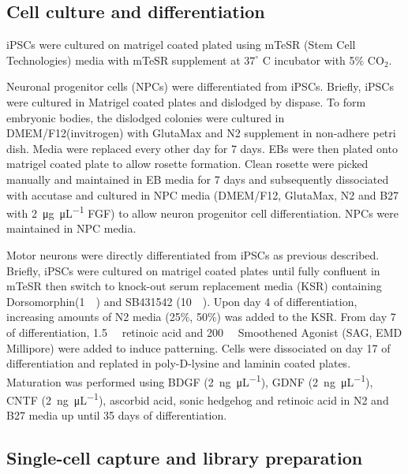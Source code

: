 

\subsection{Cell culture and differentiation}

iPSCs were cultured on matrigel coated plated using mTeSR (Stem Cell Technologies) media with mTeSR supplement at $37^\circ$ C incubator with 5\% CO$_{2}$.\par

Neuronal progenitor cells (NPCs) were differentiated from iPSCs. Briefly, iPSCs were cultured in Matrigel coated plates and dislodged by dispase. To form embryonic bodies, the dislodged colonies were cultured in DMEM/F12(invitrogen) with GlutaMax and N2 supplement in non-adhere petri dish. Media were replaced every other day for 7 days. EBs were then plated onto matrigel coated plate to allow rosette formation. Clean rosette were picked manually and maintained in EB media for 7 days and subsequently dissociated with accutase and cultured in NPC media (DMEM/F12, GlutaMax, N2 and B27 with \SI[per-mode=symbol]{2}{\micro\gram\per\micro\liter} FGF) to allow neuron progenitor cell differentiation. NPCs were maintained in NPC media.

Motor neurons were directly differentiated from iPSCs as previous described\cite{Chambers:2009ey}. Briefly, iPSCs were cultured on matrigel coated plates until fully confluent in mTeSR then switch to knock-out serum replacement media (KSR) containing Dorsomorphin(\SI{1}{\micro\Molar}) and SB431542 (\SI{10}{\micro\Molar}). Upon day 4 of differentiation, increasing amounts of N2 media (25\%, 50\%) was added to the KSR. From day 7 of differentiation, \SI{1.5}{\micro\Molar} retinoic acid and \SI{200}{\nano\Molar} Smoothened Agonist (SAG, EMD Millipore) were added to induce patterning. Cells were dissociated on day 17 of differentiation and replated in poly-D-lysine and laminin coated plates. Maturation was performed using BDGF (\SI[per-mode=symbol]{2}{\nano\gram\per\micro\liter}), GDNF (\SI[per-mode=symbol]{2}{\nano\gram\per\micro\liter}), CNTF (\SI[per-mode=symbol]{2}{\nano\gram\per\micro\liter}), ascorbid acid, sonic hedgehog and retinoic acid in N2 and B27 media up until 35 days of differentiation.


\subsection{Single-cell capture and library preparation}

